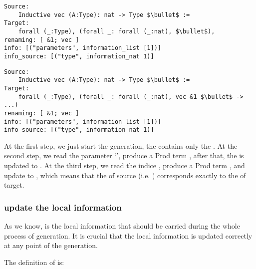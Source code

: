 \documentclass[a4paper,UKenglish,cleveref, autoref, thm-restate]{lipics-v2021}
\begin{document}
\begin{lstlisting}[language = {Coq}, basicstyle = \small]
Source:
    Inductive vec (A:Type): nat -> Type $\bullet$ :=
Target:
    forall (_:Type), (forall _: forall (_:nat), $\bullet$),
renaming: [ &1; vec ]
info: [("parameters", information_list [1])]
info_source: [("type", information_nat 1)]  
\end{lstlisting}

\begin{lstlisting}[language = {Coq}, basicstyle = \small]
Source:
    Inductive vec (A:Type): nat -> Type $\bullet$ :=
Target:
    forall (_:Type), (forall _: forall (_:nat), vec &1 $\bullet$ -> ...)
renaming: [ &1; vec ]
info: [("parameters", information_list [1])]
info_source: [("type", information_nat 1)]
\end{lstlisting}



At the first step, we just start the generation, the  contains only the . At the second step, we read the parameter `', produce a Prod term , after that, the  is updated to \coqe{[&0; vec]}. At the third step, we read the indice , produce a Prod term , and update  to \coqe{[&1; vec]}, which means that the  of source (i.e. ) corresponds exactly to the  of target.


\subsubsection{update the local information}
As we know,  is the local information that should be carried during the whole process of generation. It is crucial that the local information is updated correctly at any point of the generation.

The definition of  is:
\end{document}
